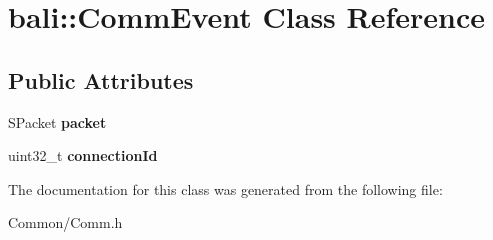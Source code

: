 \hypertarget{classbali_1_1_comm_event}{\section{bali\-:\-:Comm\-Event Class Reference}
\label{classbali_1_1_comm_event}
}
\subsection*{Public Attributes}
\begin{DoxyCompactItemize}
\item 
\hypertarget{classbali_1_1_comm_event_a2bfa9d0617be0b0515156320d705d275}{S\-Packet {\bfseries packet}}\label{classbali_1_1_comm_event_a2bfa9d0617be0b0515156320d705d275}

\item 
\hypertarget{classbali_1_1_comm_event_a617a2f6d639309e2d095157529c870d0}{uint32\-\_\-t {\bfseries connection\-Id}}\label{classbali_1_1_comm_event_a617a2f6d639309e2d095157529c870d0}

\end{DoxyCompactItemize}


The documentation for this class was generated from the following file\-:\begin{DoxyCompactItemize}
\item 
Common/Comm.\-h\end{DoxyCompactItemize}
